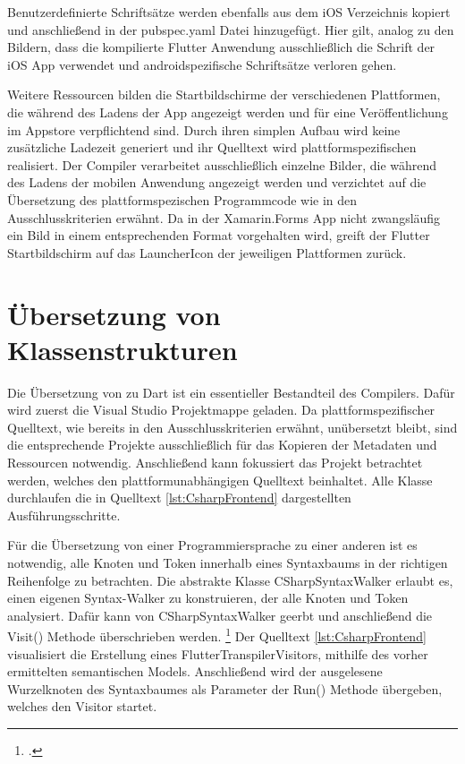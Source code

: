  


Benutzerdefinierte Schriftsätze werden ebenfalls aus dem iOS Verzeichnis kopiert und anschließend in der pubspec.yaml Datei hinzugefügt.  Hier gilt,  analog zu den Bildern,  dass die kompilierte Flutter Anwendung ausschließlich die Schrift der iOS App verwendet und androidspezifische Schriftsätze verloren gehen.

Weitere Ressourcen bilden die Startbildschirme der verschiedenen Plattformen,  die während des Ladens der App angezeigt werden und für eine Veröffentlichung im Appstore verpflichtend sind.  Durch ihren simplen Aufbau wird keine zusätzliche Ladezeit generiert und ihr Quelltext wird plattformspezifischen realisiert.  Der Compiler verarbeitet ausschließlich einzelne Bilder, die während des Ladens der mobilen Anwendung angezeigt werden und verzichtet auf die Übersetzung des plattformspezischen Programmcode wie in den Ausschlusskriterien erwähnt.  Da in der Xamarin.Forms App nicht zwangsläufig ein Bild in einem entsprechenden Format vorgehalten wird,  greift der Flutter Startbildschirm auf das LauncherIcon der jeweiligen Plattformen zurück.  

\section{Übersetzung von Klassenstrukturen}

Die Übersetzung von \Csharp zu Dart ist ein essentieller Bestandteil des Compilers.  Dafür wird zuerst die Visual Studio Projektmappe geladen.  Da plattformspezifischer Quelltext, wie bereits in den Ausschlusskriterien erwähnt,  unübersetzt bleibt, sind die entsprechende Projekte ausschließlich für das Kopieren der Metadaten und Ressourcen notwendig.  Anschließend kann fokussiert das Projekt betrachtet werden, welches den plattformunabhängigen Quelltext beinhaltet.  Alle Klasse durchlaufen die in Quelltext \ref{lst:CsharpFrontend} dargestellten Ausführungsschritte. 

Für die Übersetzung von einer Programmiersprache zu einer anderen ist es notwendig,  alle Knoten und Token innerhalb eines Syntaxbaums in der richtigen Reihenfolge zu betrachten.  Die abstrakte Klasse \glq CSharpSyntaxWalker\grq{} erlaubt es,  einen eigenen \glq Syntax-Walker\grq{} zu konstruieren,  der alle Knoten und Token analysiert.  Dafür kann von \glq CSharpSyntaxWalker\grq{} geerbt und anschließend die \glq Visit()\grq{} Methode überschrieben werden.  \footcite[Vgl.][Abgerufen am \today]{Varty2014}  Der Quelltext \ref{lst:CsharpFrontend}  visualisiert die Erstellung eines \glq FlutterTranspilerVisitors\grq ,  mithilfe des vorher ermittelten semantischen Models.  Anschließend wird der ausgelesene Wurzelknoten des Syntaxbaumes als Parameter der \glq Run()\grq{} Methode übergeben, welches den \glq Visitor\grq{} startet.  

